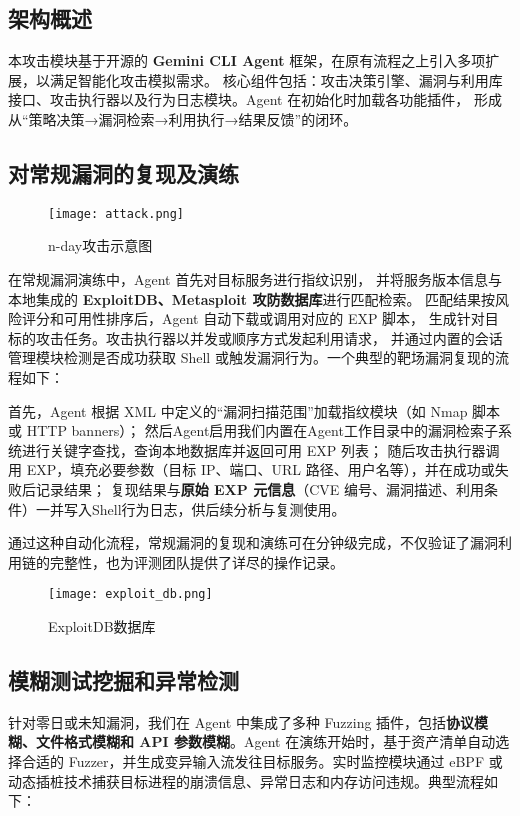 \documentclass[lang=cn,10pt]{elegantbook}
\begin{document}
\subsection{架构概述}
本攻击模块基于开源的 \textbf{Gemini CLI Agent} 框架，在原有流程之上引入多项扩展，以满足智能化攻击模拟需求。
核心组件包括：攻击决策引擎、漏洞与利用库接口、攻击执行器以及行为日志模块。Agent 在初始化时加载各功能插件，
形成从“策略决策→漏洞检索→利用执行→结果反馈”的闭环。

\subsection{对常规漏洞的复现及演练}
\begin{figure}[H]
\centering
\texttt{[image: attack.png]}  %
\caption{n-day攻击示意图}  %
\label{fig:n-day}  %
\end{figure}
在常规漏洞演练中，Agent 首先对目标服务进行指纹识别，
并将服务版本信息与本地集成的 \textbf{ExploitDB、Metasploit 攻防数据库}进行匹配检索。
匹配结果按风险评分和可用性排序后，Agent 自动下载或调用对应的 EXP 脚本，
生成针对目标的攻击任务。攻击执行器以并发或顺序方式发起利用请求，
并通过内置的会话管理模块检测是否成功获取 Shell 或触发漏洞行为。一个典型的靶场漏洞复现的流程如下：

首先，Agent 根据 XML 中定义的“漏洞扫描范围”加载指纹模块（如 Nmap 脚本或 HTTP banners）；  
然后Agent启用我们内置在Agent工作目录中的漏洞检索子系统进行关键字查找，查询本地数据库并返回可用 EXP 列表；  
随后攻击执行器调用 EXP，填充必要参数（目标 IP、端口、URL 路径、用户名等），并在成功或失败后记录结果；  
复现结果与\textbf{原始 EXP 元信息}（CVE 编号、漏洞描述、利用条件）一并写入Shell行为日志，供后续分析与复测使用。

通过这种自动化流程，常规漏洞的复现和演练可在分钟级完成，不仅验证了漏洞利用链的完整性，也为评测团队提供了详尽的操作记录。

\begin{figure}[htbp]
\centering
\texttt{[image: exploit\_db.png]}  %
\caption{ExploitDB数据库}  %
\label{fig:ExploitDB}  %
\end{figure}

\subsection{模糊测试挖掘和异常检测}

针对零日或未知漏洞，我们在 Agent 中集成了多种 Fuzzing 插件，包括\textbf{协议模糊、文件格式模糊和 API 参数模糊}。Agent 在演练开始时，基于资产清单自动选择合适的 Fuzzer，并生成变异输入流发往目标服务。实时监控模块通过 eBPF 或动态插桩技术捕获目标进程的崩溃信息、异常日志和内存访问违规。典型流程如下：
\end{document}
